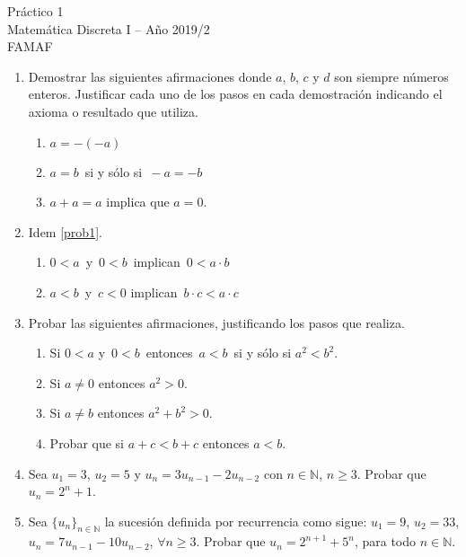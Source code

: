 \documentclass[12pt,spanish,makeidx]{amsbook}
\begin{document}
{\bf \begin{center} Práctico 1 \\ Matemática Discreta I -- Año 2019/2 \\ FAMAF \end{center}}

\smallskip

\begin{enumerate}


\item\label{prob1} Demostrar las siguientes afirmaciones donde $a$, $b$, $c$ y $d$ son siempre números enteros. Justificar cada uno de los pasos en cada demostración indicando el axioma o resultado que utiliza.
\begin{enumerate}
\item  $a=-(-a)$
\item  $a=b\,$ si y sólo si $\,-a=-b$
\item  $a+a=a$ implica que  $a=0$.
\end{enumerate}


\medskip

\item Idem \ref{prob1}.

\begin{enumerate}
 \item $0<a\,$ y $\,0<b\,$ implican $\,0<a\cdot b$
 \item $a<b\,$ y $\,c<0$ implican $\,b\cdot c<a\cdot c$
\end{enumerate}

\medskip

\item  Probar las siguientes afirmaciones, justificando los pasos que realiza.
\begin{enumerate}
  \item Si $0 < a$  y $\,0<b\,$ entonces $\,a<b\,$ si y sólo si $a^2<b^2$.
  \item Si $a\neq 0$  entonces $a^2>0$.
  \item Si $a\neq b$  entonces $a^2+b^2>0$.
  \item Probar que si $a+c <b+c$ entonces $a<b$.
\end{enumerate}

\medskip


\item Sea $u_1=3$, $u_2=5$ y $u_n=3 u_{n-1} - 2 u_{n-2}$ con $n\in \mathbb N$, $n\geq 3$.
Probar que $u_n=2^n+1$.

\smallskip

\item Sea $\{ u_n \}_{n \in \mathbb N}$ la sucesión definida por recurrencia como sigue: $u_1 = 9$, $u_2 = 33$, $u_n = 7u_{n-1} - 10u_{n-2}$, $\forall n \geq 3$. Probar que $u_n = 2^{n+1} + 5^n$, para todo $n \in \mathbb N$.




\end{enumerate}
\end{document}
